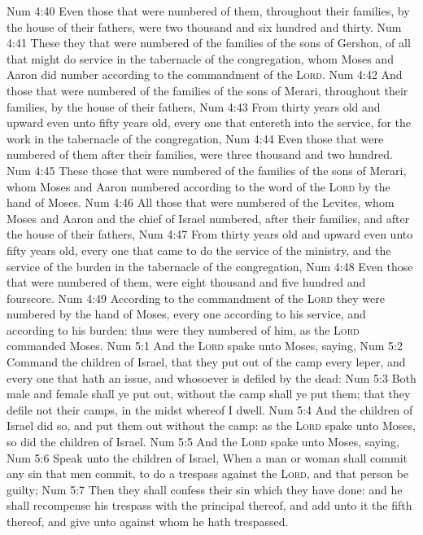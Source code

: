 \vs Num 4:40 Even those that were numbered of them, throughout their families, by the house of their fathers, were two thousand and six hundred and thirty.
\vs Num 4:41 These  they that were numbered of the families of the sons of Gershon, of all that might do service in the tabernacle of the congregation, whom Moses and Aaron did number according to the commandment of the \textsc{Lord}.
\vs Num 4:42 And those that were numbered of the families of the sons of Merari, throughout their families, by the house of their fathers,
\vs Num 4:43 From thirty years old and upward even unto fifty years old, every one that entereth into the service, for the work in the tabernacle of the congregation,
\vs Num 4:44 Even those that were numbered of them after their families, were three thousand and two hundred.
\vs Num 4:45 These  those that were numbered of the families of the sons of Merari, whom Moses and Aaron numbered according to the word of the \textsc{Lord} by the hand of Moses.
\vs Num 4:46 All those that were numbered of the Levites, whom Moses and Aaron and the chief of Israel numbered, after their families, and after the house of their fathers,
\vs Num 4:47 From thirty years old and upward even unto fifty years old, every one that came to do the service of the ministry, and the service of the burden in the tabernacle of the congregation,
\vs Num 4:48 Even those that were numbered of them, were eight thousand and five hundred and fourscore.
\vs Num 4:49 According to the commandment of the \textsc{Lord} they were numbered by the hand of Moses, every one according to his service, and according to his burden: thus were they numbered of him, as the \textsc{Lord} commanded Moses.
\vs Num 5:1 And the \textsc{Lord} spake unto Moses, saying,
\vs Num 5:2 Command the children of Israel, that they put out of the camp every leper, and every one that hath an issue, and whosoever is defiled by the dead:
\vs Num 5:3 Both male and female shall ye put out, without the camp shall ye put them; that they defile not their camps, in the midst whereof I dwell.
\vs Num 5:4 And the children of Israel did so, and put them out without the camp: as the \textsc{Lord} spake unto Moses, so did the children of Israel.
\vs Num 5:5 And the \textsc{Lord} spake unto Moses, saying,
\vs Num 5:6 Speak unto the children of Israel, When a man or woman shall commit any sin that men commit, to do a trespass against the \textsc{Lord}, and that person be guilty;
\vs Num 5:7 Then they shall confess their sin which they have done: and he shall recompense his trespass with the principal thereof, and add unto it the fifth  thereof, and give  unto  against whom he hath trespassed.
